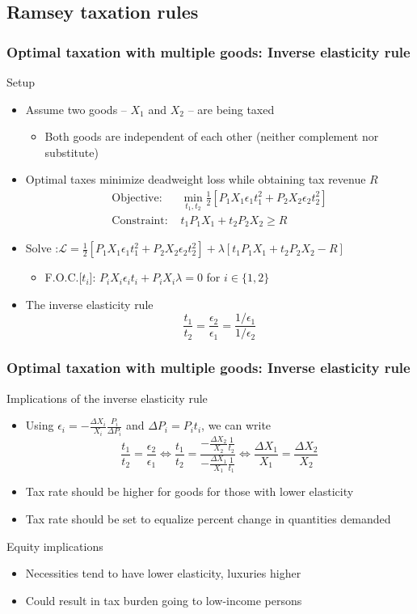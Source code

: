 \documentclass[aspectratio=169]{beamer}
\begin{document}
\subsection{Ramsey taxation rules}
\begin{frame}
\frametitle{Optimal taxation with multiple goods: Inverse elasticity rule}
Setup 
\begin{itemize}\setlength\itemsep{3pt}
\item Assume two goods -- $X_1$ and $X_2$ -- are being taxed
\begin{itemize}
\item Both goods are independent of each other (neither complement nor substitute)
\end{itemize}
\item Optimal taxes minimize deadweight loss while obtaining tax revenue $R$
\[
\begin{aligned}
\text{Objective:  } &\min_{t_1, t_2} \frac{1}{2}\left[P_1X_1\epsilon_1t_1^2+P_2X_2\epsilon_2 t_2^2\right]\\
\text{Constraint:  }& t_1P_1X_1+t_2P_2X_2 \geq R
\end{aligned}
\]
\item Solve :$\mathcal{L}=\frac{1}{2}\left[P_1X_1\epsilon_1t_1^2+P_2X_2\epsilon_2 t_2^2\right] + \lambda[t_1P_1X_1+t_2P_2X_2 - R]$
\begin{itemize}\setlength\itemsep{3pt} 
  \item F.O.C.[$t_i$]: $P_iX_i\epsilon_it_i+P_iX_i\lambda=0$ for $i\in\{1,2\}$

\end{itemize}
\item The inverse elasticity rule
\[
\frac{t_1}{t_2} = \frac{\epsilon_2}{\epsilon_1}=\frac{1/\epsilon_1}{1/\epsilon_2}
\]

\end{itemize}
\end{frame}

\begin{frame}
\frametitle{Optimal taxation with multiple goods: Inverse elasticity rule}
Implications of the inverse elasticity rule
\begin{itemize}\setlength\itemsep{3pt}
\item Using $\epsilon_i = -\frac{\Delta X_i}{X_i}\frac{P_i}{\Delta P_i}$ and $\Delta P_i = P_it_i$, we can write
\[
\frac{t_1}{t_2} = \frac{\epsilon_2}{\epsilon_1}\iff\frac{t_1}{t_2} = \frac{-\frac{\Delta X_2}{X_2}\frac{1}{t_2}}{-\frac{\Delta X_1}{X_1}\frac{1}{t_1}}\iff \frac{\Delta X_1}{X_1}=\frac{\Delta X_2}{X_2}
\]
\item Tax rate should be higher for goods for those with lower elasticity
\item Tax rate should be set to equalize percent change in quantities demanded
\end{itemize}\medskip
Equity implications
\begin{itemize}
\item Necessities tend to have lower elasticity, luxuries higher
\item Could result in tax burden going to low-income persons
\end{itemize}
\end{frame}
\end{document}
